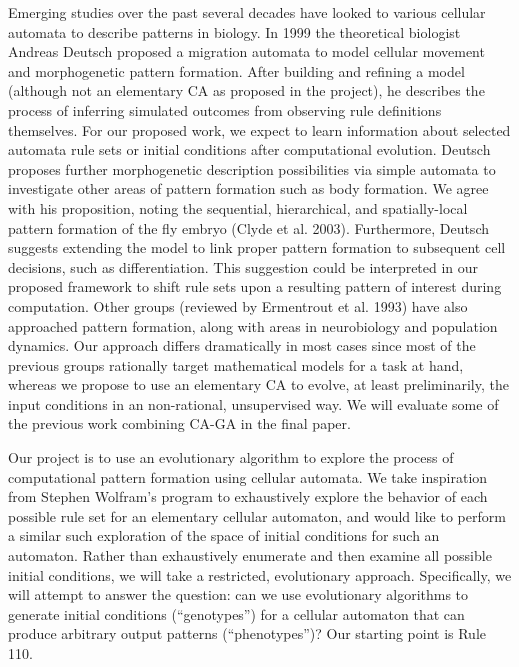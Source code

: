 \documentclass[twocolumn]{article}
\begin{document}
Emerging studies over the past several decades have looked to various cellular automata to describe patterns in biology.  In 1999 the theoretical biologist Andreas Deutsch proposed a migration automata to model cellular movement and morphogenetic pattern formation.  After building and refining a model (although not an elementary CA as proposed in the project), he describes the process of inferring simulated outcomes from observing rule definitions themselves.  For our proposed work, we expect to learn information about selected automata rule sets or initial conditions after computational evolution.  Deutsch proposes further morphogenetic description possibilities via simple automata to investigate other areas of pattern formation such as body formation.  We agree with his proposition, noting the sequential, hierarchical, and spatially-local pattern formation of the fly embryo (Clyde et al. 2003).  Furthermore, Deutsch suggests extending the model to link proper pattern formation to subsequent cell decisions, such as differentiation.  This suggestion could be interpreted in our proposed framework to shift rule sets upon a resulting pattern of interest during computation.  Other groups (reviewed by Ermentrout et al. 1993) have also approached pattern formation, along with areas in neurobiology and population dynamics.  Our approach differs dramatically in most cases since most of the previous groups rationally target mathematical models for a task at hand, whereas we propose to use an elementary CA to evolve, at least preliminarily, the input conditions in an non-rational, unsupervised way. 
We will evaluate some of the previous work combining CA-GA in the final paper.

Our project is to use an evolutionary algorithm to explore the process of computational pattern formation using cellular automata. We take inspiration from Stephen Wolfram’s program to exhaustively explore the behavior of each possible rule set for an elementary cellular automaton, and would like to perform a similar such exploration of the space of initial conditions for such an automaton. Rather than exhaustively enumerate and then examine all possible initial conditions, we will take a restricted, evolutionary approach. Specifically, we will attempt to answer the question: can we use evolutionary algorithms to generate initial conditions (``genotypes'') for a cellular automaton that can produce arbitrary output patterns (``phenotypes'')? Our starting point is Rule 110. 
\end{document}
